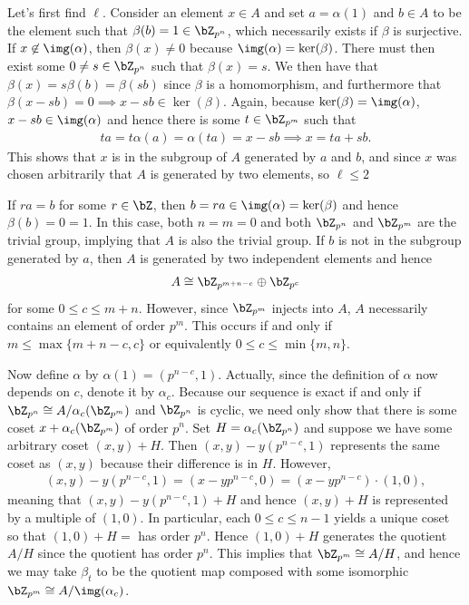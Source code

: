 \begin{homework}[e]
\begin{prf}
    Let's first find $\ell$. Consider an element $x \in A$ and set $a = \alpha(1)$ and $b \in A$ to be the element such that $\beta(b) = 1 \in \bZ_{p^n}$, which necessarily exists if $\beta$ is surjective. If $x\not\in \img(\alpha)$, then $\beta(x) \neq 0$ because $\img(\alpha) = \ker(\beta)$. There must then exist some $0\neq s \in \bZ_{p^n}$ such that $\beta(x) = s$. We then have that $\beta(x) = s\beta(b) = \beta(sb)$ since $\beta$ is a homomorphism, and furthermore that $\beta(x - sb) = 0\implies x - sb \in \ker(\beta)$. Again, because $\ker(\beta) = \img(\alpha)$, $x - sb \in \img(\alpha)$ and hence there is some $t \in \bZ_{p^m}$ such that
    \begin{align*}
      ta = t\alpha(a) = \alpha(ta) = x - sb \implies x = ta + sb.
    \end{align*}
    This shows that $x$ is in the subgroup of $A$ generated by $a$ and $b$, and since $x$ was chosen arbitrarily that $A$ is generated by two elements, so $\ell \leq 2$

    If $ra = b$ for some $r \in \bZ$, then $b = ra\in \img(\alpha) = \ker(\beta)$ and hence $\beta(b) = 0 = 1$. In this case, both $n = m = 0$ and both $\bZ_{p^n}$ and $\bZ_{p^m}$ are the trivial group, implying that $A$ is also the trivial group. If $b$ is not in the subgroup generated by $a$, then $A$ is generated by two independent elements and hence
    \begin{align*}
      A \cong \bZ_{p^{m+n-c}} \oplus \bZ_{p^c}
    \end{align*}
    for some $0\leq c\leq m+n$. However, since $\bZ_{p^m}$ injects into $A$, $A$ necessarily contains an element of order $p^m$. This occurs if and only if $m \leq \max\{m + n - c, c\}$ or equivalently $0\leq c \leq \min\{m,n\}$.

    Now define $\alpha$ by $\alpha(1) = (p^{n-c},1)$. Actually, since the definition of $\alpha$ now depends on $c$, denote it by $\alpha_c$. Because our sequence is exact if and only if $\bZ_{p^n} \cong A/\alpha_c(\bZ_{p^m})$ and $\bZ_{p^n}$ is cyclic, we need only show that there is some coset $x + \alpha_c(\bZ_{p^{m}})$ of order $p^n$. Set $H = \alpha_c(\bZ_{p^n})$ and suppose we have some arbitrary coset $(x,y) + H$. Then $(x,y) - y(p^{n-c},1)$ represents the same coset as $(x,y)$ because their difference is in $H$. However,
    \begin{align*}
      (x,y) - y(p^{n-c},1) = (x - yp^{n-c},0) = (x - yp^{n - c})\cdot (1,0),
    \end{align*}
    meaning that $(x,y) - y(p^{n-c},1) + H$ and hence $(x,y) + H$ is represented by a multiple of $(1,0)$. In particular, each $0\leq c \leq n - 1$ yields a unique coset so that $(1,0) + H = $ has order $p^n$. Hence $(1,0) + H$ generates the quotient $A/H$ since the quotient has order $p^n$. This implies that $\bZ_{p^m} \cong A/H$, and hence we may take $\beta_t$ to be the quotient map composed with some isomorphic $\bZ_{p^m} \cong A/\img(\alpha_c)$.


\end{prf}
\end{homework}
